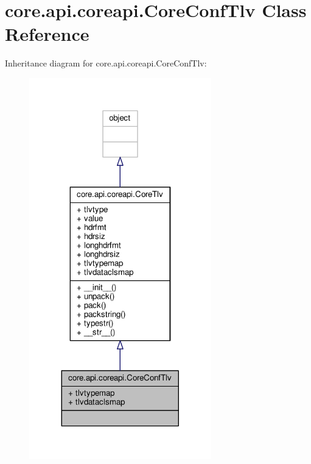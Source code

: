 \hypertarget{classcore_1_1api_1_1coreapi_1_1_core_conf_tlv}{\section{core.\+api.\+coreapi.\+Core\+Conf\+Tlv Class Reference}
\label{classcore_1_1api_1_1coreapi_1_1_core_conf_tlv}
}


Inheritance diagram for core.\+api.\+coreapi.\+Core\+Conf\+Tlv\+:
\nopagebreak
\begin{figure}[H]
\begin{center}
\leavevmode
\includegraphics[width=224pt]{classcore_1_1api_1_1coreapi_1_1_core_conf_tlv__inherit__graph}
\end{center}
\end{figure}


